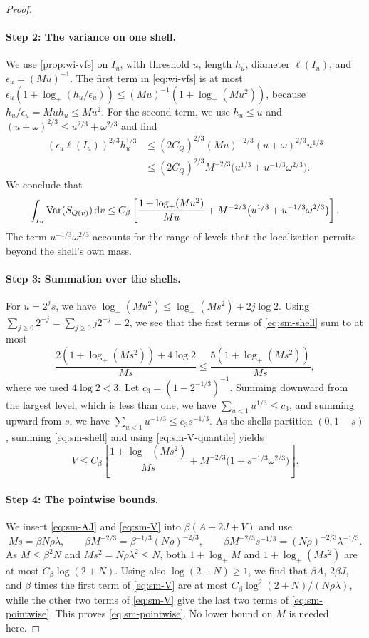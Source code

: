 \begin{proof}
\paragraph{Step 2: The variance on one shell.} We use \cref{prop:wi-vfs}
on $I_u$, with threshold $u$, length $h_u$, diameter $\ell(I_u)$, and
$\epsilon_u=(Mu)^{-1}$. The first term in \eqref{eq:wi-vfs} is at most
$\epsilon_u(1+\log_+(h_u/\epsilon_u))\le(Mu)^{-1}(1+\log_+(Mu^2))$,
because $h_u/\epsilon_u=Muh_u\le Mu^2$. For the second term, we use
$h_u\le u$ and $(u+\omega)^{2/3}\le u^{2/3}+\omega^{2/3}$ and find
\[
\begin{aligned}
 (\epsilon_u\ell(I_u))^{2/3}h_u^{1/3}
 &\le(2C_Q)^{2/3}(Mu)^{-2/3}(u+\omega)^{2/3}u^{1/3}\\
 &\le(2C_Q)^{2/3}M^{-2/3}
       \bigl(u^{1/3}+u^{-1/3}\omega^{2/3}\bigr).
\end{aligned}
\]
We conclude that
\begin{equation}\label{eq:sm-shell}
 \int_{I_u}\operatorname{Var}(S_{Q(v)})\,\mathrm d v
 \le C_\beta\left[
 \frac{1+\log_+(Mu^2)}{Mu}
 +M^{-2/3}\bigl(u^{1/3}+u^{-1/3}\omega^{2/3}\bigr)
 \right].
\end{equation}
The term $u^{-1/3}\omega^{2/3}$ accounts for the range of levels that
the localization permits beyond the shell's own mass.

\paragraph{Step 3: Summation over the shells.} For $u=2^js$, we have
$\log_+(Mu^2)\le\log_+(Ms^2)+2j\log2$. Using
$\sum_{j\ge0}2^{-j}=\sum_{j\ge0}j2^{-j}=2$, we see that the first terms
of \eqref{eq:sm-shell} sum to at most
\[
 \frac{2(1+\log_+(Ms^2))+4\log2}{Ms}
 \le\frac{5(1+\log_+(Ms^2))}{Ms},
\]
where we used $4\log2<3$. Let $c_3=(1-2^{-1/3})^{-1}$. Summing downward
from the largest level, which is less than one, we have
$\sum_{u<1}u^{1/3}\le c_3$, and summing upward from $s$, we have
$\sum_{u<1}u^{-1/3}\le c_3s^{-1/3}$. As the shells partition
$(0,1-s)$, summing \eqref{eq:sm-shell} and using
\eqref{eq:sm-V-quantile} yields
\begin{equation}\label{eq:sm-V}
 V\le C_\beta\left[
 \frac{1+\log_+(Ms^2)}{Ms}
 +M^{-2/3}\bigl(1+s^{-1/3}\omega^{2/3}\bigr)
 \right].
\end{equation}

\paragraph{Step 4: The pointwise bounds.} We insert \eqref{eq:sm-AJ} and
\eqref{eq:sm-V} into $\beta(A+2J+V)$ and use
\[
 Ms=\beta N\rho\lambda,\qquad
 \beta M^{-2/3}=\beta^{-1/3}(N\rho)^{-2/3},\qquad
 \beta M^{-2/3}s^{-1/3}=(N\rho)^{-2/3}\lambda^{-1/3}.
\]
As $M\le\beta^2N$ and $Ms^2=N\rho\lambda^2\le N$, both $1+\log_+M$ and
$1+\log_+(Ms^2)$ are at most $C_\beta\log(2+N)$. Using also
$\log(2+N)\ge1$, we find that $\beta A$, $2\beta J$, and $\beta$ times the
first term of \eqref{eq:sm-V} are at most
$C_\beta\log^2(2+N)/(N\rho\lambda)$, while the other two terms of
\eqref{eq:sm-V} give the last two terms of \eqref{eq:sm-pointwise}. This
proves \eqref{eq:sm-pointwise}. No lower bound on $M$ is needed here.


\end{proof}
